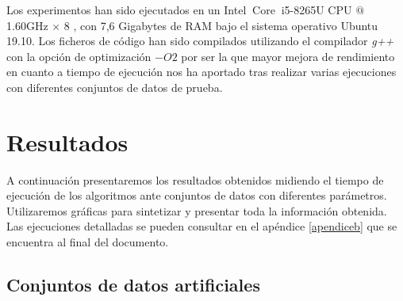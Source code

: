 \documentclass[oneside,openright,titlepage,numbers=noenddot,openany,headinclude,footinclude=true,
cleardoublepage=empty,abstractoff,BCOR=5mm,paper=a4,fontsize=12pt,main=spanish]{scrreprt}
\begin{document}
Los experimentos han sido ejecutados en un Intel\textregistered $ \ $ Core\texttrademark $ \ $ i5-8265U CPU $@$ 1.60GHz × 8 , con 7,6 Gigabytes de RAM bajo el sistema operativo Ubuntu 19.10. Los ficheros de código han sido compilados utilizando el compilador \textit{g++} con la opción de optimización $-O2$ por ser la que mayor mejora de rendimiento en cuanto a tiempo de ejecución nos ha aportado tras realizar varias ejecuciones con diferentes conjuntos de datos de prueba. 

\section{Resultados}

A continuación presentaremos los resultados obtenidos midiendo el tiempo de ejecución de los algoritmos ante conjuntos de datos con diferentes parámetros. Utilizaremos gráficas para sintetizar y presentar toda la información obtenida. Las ejecuciones detalladas se pueden consultar en el apéndice \ref{apendiceb} que se encuentra al final del documento.

\subsection{ Conjuntos de datos artificiales}
\end{document}
